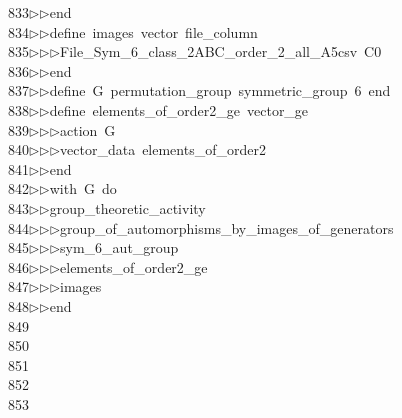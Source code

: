 \begin{tabbing}
833\>$\triangleright$\>$\triangleright$\>end\ \\[0pt]
834\>$\triangleright$\>$\triangleright$\>define\ images\ vector\ file\_column\ \\[0pt]
835\>$\triangleright$\>$\triangleright$\>$\triangleright$\>File\_Sym\_6\_class\_2ABC\_order\_2\_all\_A5csv\ C0\ \\[0pt]
836\>$\triangleright$\>$\triangleright$\>end\ \\[0pt]
837\>$\triangleright$\>$\triangleright$\>define\ G\ permutation\_group\ symmetric\_group\ 6\ end\ \\[0pt]
838\>$\triangleright$\>$\triangleright$\>define\ elements\_of\_order2\_ge\ vector\_ge\ \\[0pt]
839\>$\triangleright$\>$\triangleright$\>$\triangleright$\>action\ G\ \\[0pt]
840\>$\triangleright$\>$\triangleright$\>$\triangleright$\>vector\_data\ elements\_of\_order2\ \\[0pt]
841\>$\triangleright$\>$\triangleright$\>end\ \\[0pt]
842\>$\triangleright$\>$\triangleright$\>with\ G\ do\ \\[0pt]
843\>$\triangleright$\>$\triangleright$\>group\_theoretic\_activity\ \\[0pt]
844\>$\triangleright$\>$\triangleright$\>$\triangleright$\>group\_of\_automorphisms\_by\_images\_of\_generators\ \\[0pt]
845\>$\triangleright$\>$\triangleright$\>$\triangleright$\>sym\_6\_aut\_group\ \\[0pt]
846\>$\triangleright$\>$\triangleright$\>$\triangleright$\>elements\_of\_order2\_ge\ \\[0pt]
847\>$\triangleright$\>$\triangleright$\>$\triangleright$\>images\ \\[0pt]
848\>$\triangleright$\>$\triangleright$\>end\\[0pt]
849\>\\[0pt]
850\>\\[0pt]
851\>\\[0pt]
852\>\\[0pt]
853\>\\[0pt]

\end{tabbing}
